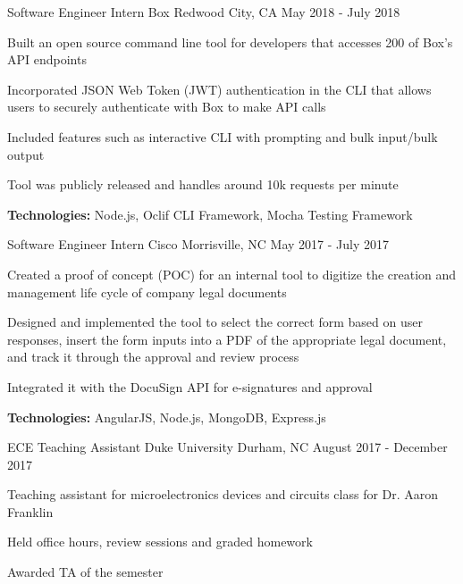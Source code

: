 \begin{cventries}
  \cventry
    {Software Engineer Intern} %
    {Box} %
    {Redwood City, CA} %
    {May 2018 - July 2018} %
    {
      \begin{cvitems} %
        \item{Built an open source command line tool for developers that accesses 200 of Box’s API endpoints}
        \item{Incorporated JSON Web Token (JWT) authentication in the CLI that allows users to securely authenticate with Box to make API calls}
        \item{Included features such as interactive CLI with prompting and bulk input/bulk output}
        \item{Tool was publicly released and handles around 10k requests per minute}
        {\setlength \itemindent{-2ex} \itemsep2pt \item[] \textbf{Technologies:} Node.js, Oclif CLI Framework, Mocha Testing Framework}
        {\setlength \itemindent{-2ex} \itemsep2pt \item[]  \href{https://sujaygarlanka.com/experience.html\#internship}{ \faPlayCircle \textbf{\color{awesome}{ Demo}}} \href{https://github.com/box/boxcli}{ \faGithub \textbf{\color{awesome}{ Code}}}}
      \end{cvitems}
    }

  \cventry
    {Software Engineer Intern} %
    {Cisco} %
    {Morrisville, NC} %
    {May 2017 - July 2017} %
    {
      \begin{cvitems} %
        \item{Created a proof of concept (POC) for an internal tool to digitize the creation and management life cycle of company legal documents}
        \item{Designed and implemented the tool to select the correct form based on user responses, insert the form inputs into a PDF of the appropriate legal document, and track it through the approval and review process}
        \item{Integrated it with the DocuSign API for e-signatures and approval}
        {\setlength \itemindent{-2ex} \itemsep2pt \item[] \textbf{Technologies:} AngularJS, Node.js, MongoDB, Express.js}
      \end{cvitems}
    }
    
    \cventry
    {ECE Teaching Assistant} %
    {Duke University} %
    {Durham, NC} %
    {August 2017 - December 2017} %
    {
      \begin{cvitems} %
        \item{Teaching assistant for microelectronics devices and circuits class for Dr. Aaron Franklin}
        \item{Held office hours, review sessions and graded homework}
        \item{Awarded TA of the semester}
      \end{cvitems}
    }
\end{cventries}
